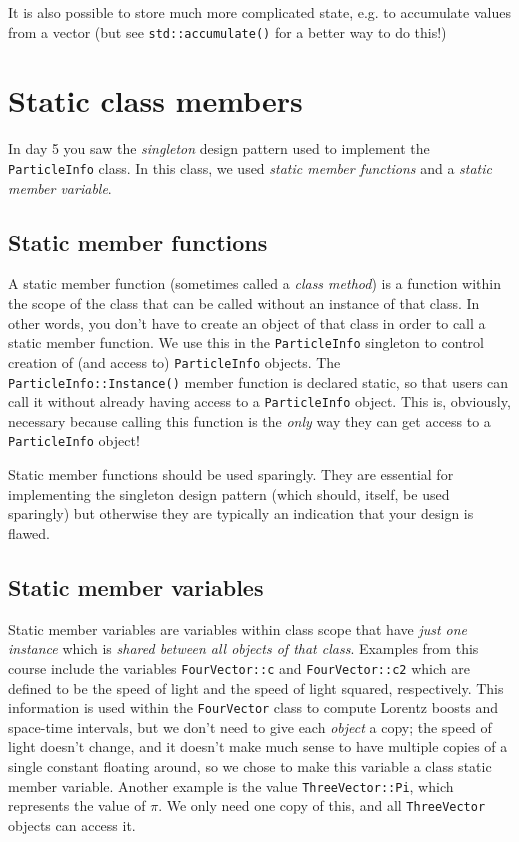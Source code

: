 \documentclass[a4paper]{scrartcl}
\begin{document}
It is also possible to store much more complicated state, e.g. to accumulate values from a vector (but see \verb|std::accumulate()| for a better way to do this!)

\section{Static class members}
In day 5 you saw the \emph{singleton} design pattern used to implement the \verb|ParticleInfo| class. In this class, we used \emph{static member functions} and a \emph{static member variable}.

\subsection{Static member functions}
A static member function (sometimes called a \emph{class method}) is a function within the scope of the class that can be called without an instance of that class. In other words, you don't have to create an object of that class in order to call a static member function. We use this in the \verb|ParticleInfo| singleton to control creation of (and access to) \verb|ParticleInfo| objects. The \verb|ParticleInfo::Instance()| member function is declared static, so that users can call it without already having access to a \verb|ParticleInfo| object. This is, obviously, necessary because calling this function is the \emph{only} way they can get access to a \verb|ParticleInfo| object!

Static member functions should be used sparingly. They are essential for implementing the singleton design pattern (which should, itself, be used sparingly) but otherwise they are typically an indication that your design is flawed.

\subsection{Static member variables}
Static member variables are variables within class scope that have \emph{just one instance} which is \emph{shared between all objects of that class}. Examples from this course include the variables \verb|FourVector::c| and \verb|FourVector::c2| which are defined to be the speed of light and the speed of light squared, respectively. This information is used within the \verb|FourVector| class to compute Lorentz boosts and space-time intervals, but we don't need to give each \emph{object} a copy; the speed of light doesn't change, and it doesn't make much sense to have multiple copies of a single constant floating around, so we chose to make this variable a class static member variable. Another example is the value \verb|ThreeVector::Pi|, which represents the value of $\pi$. We only need one copy of this, and all \verb|ThreeVector| objects can access it.
\end{document}
